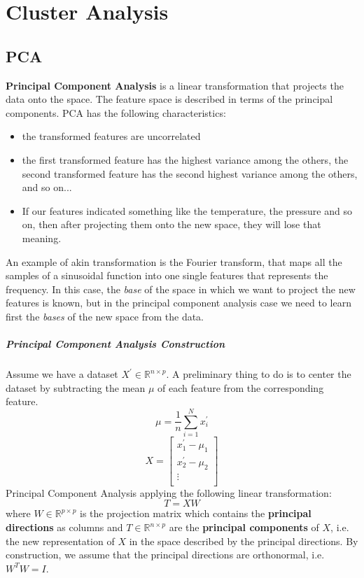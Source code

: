 \chapter{Cluster Analysis}
\section{PCA}
\textbf{Principal Component Analysis} is a linear transformation that projects the data onto the space.
The feature space is described in terms of the principal components. PCA has the following characteristics:
\begin{itemize}
    \item the transformed features are uncorrelated
    \item the first transformed feature has the highest variance among the others, the second transformed feature has the second highest variance among the others, and so on...
    \item If our features indicated something like the temperature, the pressure and so on, then after projecting them onto the new space, they will lose that meaning.
\end{itemize}

An example of akin transformation is the Fourier transform, that maps all the samples of a sinusoidal function into one single features that represents the frequency. In this case, the \textit{base} of the space in which we want to project the new features is known, but in the principal component analysis case we need to learn first the \textit{bases} of the new space from the data.

\paragraph*{Principal Component Analysis Construction}
Assume we have a dataset $X^{\prime} \in \mathbb{R}^{n \times p}$. A preliminary thing to do is to center the dataset by subtracting the mean $\mu$ of each feature from the corresponding feature.
\[
    \mu = \frac{1}{n} \sum_{i = 1}^{N} x^{\prime}_i
\]
\[
    X = \begin{bmatrix}
        x^{\prime}_1 - \mu_1 \\
        x^{\prime}_2 - \mu_2 \\
        \vdots               \\
    \end{bmatrix}
\]
Principal Component Analysis applying the following linear transformation:
\[
    T = X W
\]
where $W \in \mathbb{R}^{p \times p}$ is the projection matrix which contains the \textbf{principal directions} as columns and $T \in \mathbb{R}^{n \times p}$ are the \textbf{principal components} of $X$, i.e. the new representation of $X$ in the space described by the principal directions. By construction, we assume that the principal directions are orthonormal, i.e. $W^T W = I$.

